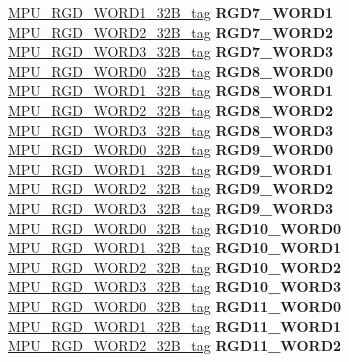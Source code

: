 \begin{DoxyCompactItemize}
\begin{tabbing}
\>\>\mbox{\hyperlink{unionMPU__RGD__WORD1__32B__tag}{MPU\_RGD\_WORD1\_32B\_tag}} {\bfseries RGD7\_WORD1}\\
\>\>\mbox{\hyperlink{unionMPU__RGD__WORD2__32B__tag}{MPU\_RGD\_WORD2\_32B\_tag}} {\bfseries RGD7\_WORD2}\\
\>\>\mbox{\hyperlink{unionMPU__RGD__WORD3__32B__tag}{MPU\_RGD\_WORD3\_32B\_tag}} {\bfseries RGD7\_WORD3}\\
\>\>\mbox{\hyperlink{unionMPU__RGD__WORD0__32B__tag}{MPU\_RGD\_WORD0\_32B\_tag}} {\bfseries RGD8\_WORD0}\\
\>\>\mbox{\hyperlink{unionMPU__RGD__WORD1__32B__tag}{MPU\_RGD\_WORD1\_32B\_tag}} {\bfseries RGD8\_WORD1}\\
\>\>\mbox{\hyperlink{unionMPU__RGD__WORD2__32B__tag}{MPU\_RGD\_WORD2\_32B\_tag}} {\bfseries RGD8\_WORD2}\\
\>\>\mbox{\hyperlink{unionMPU__RGD__WORD3__32B__tag}{MPU\_RGD\_WORD3\_32B\_tag}} {\bfseries RGD8\_WORD3}\\
\>\>\mbox{\hyperlink{unionMPU__RGD__WORD0__32B__tag}{MPU\_RGD\_WORD0\_32B\_tag}} {\bfseries RGD9\_WORD0}\\
\>\>\mbox{\hyperlink{unionMPU__RGD__WORD1__32B__tag}{MPU\_RGD\_WORD1\_32B\_tag}} {\bfseries RGD9\_WORD1}\\
\>\>\mbox{\hyperlink{unionMPU__RGD__WORD2__32B__tag}{MPU\_RGD\_WORD2\_32B\_tag}} {\bfseries RGD9\_WORD2}\\
\>\>\mbox{\hyperlink{unionMPU__RGD__WORD3__32B__tag}{MPU\_RGD\_WORD3\_32B\_tag}} {\bfseries RGD9\_WORD3}\\
\>\>\mbox{\hyperlink{unionMPU__RGD__WORD0__32B__tag}{MPU\_RGD\_WORD0\_32B\_tag}} {\bfseries RGD10\_WORD0}\\
\>\>\mbox{\hyperlink{unionMPU__RGD__WORD1__32B__tag}{MPU\_RGD\_WORD1\_32B\_tag}} {\bfseries RGD10\_WORD1}\\
\>\>\mbox{\hyperlink{unionMPU__RGD__WORD2__32B__tag}{MPU\_RGD\_WORD2\_32B\_tag}} {\bfseries RGD10\_WORD2}\\
\>\>\mbox{\hyperlink{unionMPU__RGD__WORD3__32B__tag}{MPU\_RGD\_WORD3\_32B\_tag}} {\bfseries RGD10\_WORD3}\\
\>\>\mbox{\hyperlink{unionMPU__RGD__WORD0__32B__tag}{MPU\_RGD\_WORD0\_32B\_tag}} {\bfseries RGD11\_WORD0}\\
\>\>\mbox{\hyperlink{unionMPU__RGD__WORD1__32B__tag}{MPU\_RGD\_WORD1\_32B\_tag}} {\bfseries RGD11\_WORD1}\\
\>\>\mbox{\hyperlink{unionMPU__RGD__WORD2__32B__tag}{MPU\_RGD\_WORD2\_32B\_tag}} {\bfseries RGD11\_WORD2}\\

\end{tabbing}
\end{DoxyCompactItemize}

